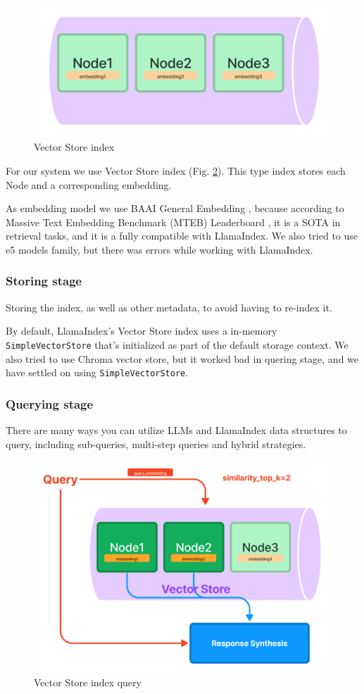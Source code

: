 \documentclass[conference, 11pt]{IEEEtran}
\begin{document}
\begin{figure}[h]
\centering
\includegraphics[width=0.8\linewidth]{vector_store.png}
\caption{Vector Store index}
\label{fig:vector_store}
\end{figure}

For our system we use Vector Store index (Fig. \ref{fig:vector_store}). This type index stores each Node and a corresponding embedding.

As embedding model we use BAAI General Embedding \cite{bge}, because according to Massive Text Embedding Benchmark (MTEB) Leaderboard \cite{mteb}, it is a SOTA in retrieval tasks, and it is a fully compatible with LlamaIndex. We also tried to use e5 models family, but there was errors while working with LlamaIndex.

\subsubsection{Storing stage}
Storing the index, as well as other metadata, to avoid having to re-index it.

By default, LlamaIndex's Vector Store index uses a in-memory \texttt{SimpleVectorStore} that’s initialized as part of the default storage context. We also tried to use Chroma vector store, but it worked bad in quering stage, and we have settled on using \texttt{SimpleVectorStore}.

\subsubsection{Querying stage}
There are many ways you can utilize LLMs and LlamaIndex data structures to query, including sub-queries, multi-step queries and hybrid strategies.

\begin{figure}[h]
\centering
\includegraphics[width=0.8\linewidth]{vector_store_query.png}
\caption{Vector Store index query}
\label{fig:vector_store}
\end{figure}
\end{document}
